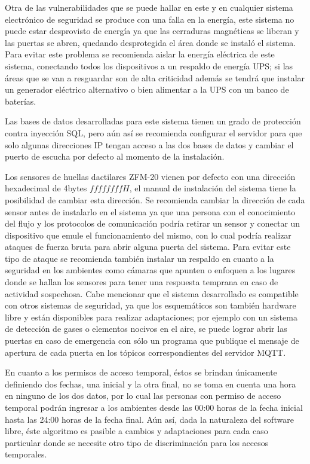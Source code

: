 \documentclass[../principal]{subfiles}
\begin{document}
  Otra de las vulnerabilidades que se puede hallar en este y en cualquier sistema electrónico de seguridad se produce con una falla en la energía, este sistema no puede estar desprovisto de energía ya que las cerraduras magnéticas se liberan y las puertas se abren, quedando desprotegida el área donde se instaló el sistema. Para evitar este problema se recomienda aislar la energía eléctrica de este sistema, conectando todos los dispositivos a un respaldo de energía UPS; si las áreas que se van a resguardar son de alta criticidad además se tendrá que instalar un generador eléctrico alternativo o bien alimentar a la UPS con un banco de baterías.

  Las bases de datos desarrolladas para este sistema tienen un grado de protección contra inyección SQL, pero aún así se recomienda configurar el servidor para que solo algunas direcciones IP tengan acceso a las dos bases de datos y cambiar el puerto de escucha por defecto al momento de la instalación.

  Los sensores de huellas dactilares ZFM-20 vienen por defecto con una dirección hexadecimal de 4bytes $ ffffffffH $, el manual de instalación del sistema tiene la posibilidad de cambiar esta dirección. Se recomienda cambiar la dirección de cada sensor antes de instalarlo en el sistema ya que una persona con el conocimiento del flujo y los protocolos de comunicación podría retirar un sensor y conectar un dispositivo que emule el funcionamiento del mismo, con lo cual podría realizar ataques de fuerza bruta para abrir alguna puerta del sistema. Para evitar este tipo de ataque se recomienda también instalar un respaldo en cuanto a la seguridad en los ambientes como cámaras que apunten o enfoquen a los lugares donde se hallan los sensores para tener una respuesta temprana en caso de actividad sospechosa. Cabe mencionar que el sistema desarrollado es compatible con otros sistemas de seguridad, ya que los esquemáticos son también hardware libre y están disponibles para realizar adaptaciones; por ejemplo con un sistema de detección de gases o elementos nocivos en el aire, se puede lograr abrir las puertas en caso de emergencia con sólo un programa que publique el mensaje de apertura de cada puerta en los tópicos correspondientes del servidor MQTT.

  En cuanto a los permisos de acceso temporal, éstos se brindan únicamente definiendo dos fechas, una inicial y la otra final, no se toma en cuenta una hora en ninguno de los dos datos, por lo cual las personas con permiso de acceso temporal podrán ingresar a los ambientes desde las 00:00 horas de la fecha inicial hasta las 24:00 horas de la fecha final. Aún así, dada la naturaleza del software libre, éste algoritmo es pasible a cambios y adaptaciones para cada caso particular donde se necesite otro tipo de discriminación para los accesos temporales.
\end{document}
